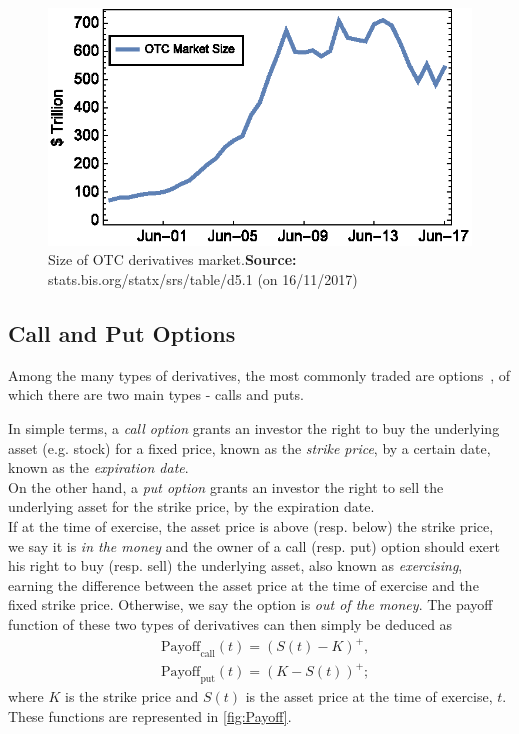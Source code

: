 \documentclass[a4paper,twocolumn,aps,prd,longbibliography,superscriptaddress]{revtex4-1}
\begin{document}
\begin{figure}[H]
    \centering
      \includegraphics[width=.9\columnwidth,trim={2pt 17pt 0 0},clip]{OTC.eps}
      \caption{Size of OTC derivatives market.\newline \footnotesize{\textbf{Source:} stats.bis.org/statx/srs/table/d5.1 (on 16/11/2017)}}\label{fig:OTC}
    \end{figure}

\subsection{Call and Put Options}
Among the many types of derivatives, the most commonly traded are options~\citep{Hull}, of which there are two main types - calls and puts.

In simple terms, a \textit{call option} grants an investor the right to buy the underlying asset (e.g. stock) for a fixed price, known as the \textit{strike price}, by a certain date, known as the \textit{expiration date}.\\
On the other hand, a \textit{put option} grants an investor the right to sell the underlying asset for the strike price, by the expiration date.\\
If at the time of exercise, the asset price is above (resp. below) the strike price, we say it is \textit{in the money} and the owner of a call (resp. put) option should exert his right to buy (resp. sell) the underlying asset, also known as \textit{exercising}, earning the difference between the asset price at the time of exercise and the fixed strike price. Otherwise, we say the option is \textit{out of the money}.
The payoff function of these two types of derivatives can then simply be deduced as
\begin{equation}\label{callput}
\begin{split}
&\text{Payoff}_\text{call}(t)=(S(t)-K)^+,\\
&\text{Payoff}_\text{put}(t)=(K-S(t))^+;
\end{split}
\end{equation}
\noindent where $K$ is the strike price and $S(t)$ is the asset price at the time of exercise, $t$. These functions are represented in \autoref{fig:Payoff}.
\end{document}
